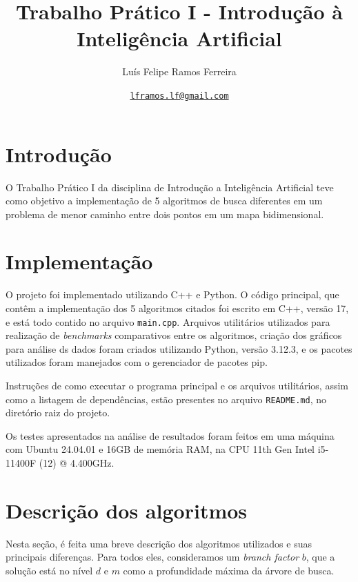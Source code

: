 \documentclass{article}
\title{Trabalho Prático I - Introdução à Inteligência Artificial}
\author{Luís Felipe Ramos Ferreira}
\date{\href{mailto:lframos.lf@gmail.com}{\texttt{lframos.lf@gmail.com}}
}
\begin{document}
\maketitle

\section{Introdução}

O Trabalho Prático I da disciplina de Introdução a Inteligência Artificial teve como objetivo a implementação de
5 algoritmos de busca diferentes em um problema de menor caminho entre dois pontos em um mapa bidimensional.

\section{Implementação}

O projeto foi implementado utilizando C++ e Python. O código principal, que contêm a implementação dos 5 algoritmos
citados foi escrito em C++, versão 17, e está todo contido no arquivo \texttt{main.cpp}. Arquivos utilitários utilizados para
realização de \textit{benchmarks} comparativos entre os algoritmos, criação dos gráficos para análise ds dados foram criados
utilizando Python, versão 3.12.3, e os pacotes utilizados foram manejados com o gerenciador de pacotes pip.

Instruções de como executar o programa principal e os arquivos utilitários, assim como a listagem de dependências, estão
presentes no arquivo \texttt{README.md}, no diretório raiz do projeto.

Os testes apresentados na análise de resultados foram feitos em uma máquina com Ubuntu 24.04.01 e 16GB de memória RAM, na CPU
11th Gen Intel i5-11400F (12) @ 4.400GHz.


\section{Descrição dos algoritmos}

Nesta seção, é feita uma breve descrição dos algoritmos utilizados e suas principais diferenças.
Para todos eles, consideramos um \textit{branch factor} \(b\),
que a solução está no nível \(d\) e \(m\) como a profundidade máxima da árvore de busca.
\end{document}
